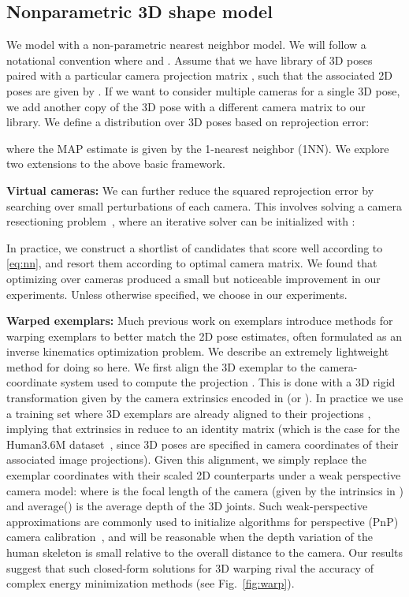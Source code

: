 \documentclass[10pt,twocolumn,letterpaper]{article}
\begin{document}
\subsection{Nonparametric 3D shape model} \label{nn}
We model  with a non-parametric nearest neighbor model. We will follow a notational convention where  and . Assume that we have library of 3D poses  paired with a particular camera projection matrix , such that the associated 2D poses are given by . If we want to consider multiple cameras for a single 3D pose, we add another copy of the 3D pose with a different camera matrix to our library. We define a distribution over 3D poses based on reprojection error:

\noindent where the MAP estimate is given by the 1-nearest neighbor (1NN).  We explore two extensions to the above basic framework.

{\bf Virtual cameras:} We can further reduce the squared reprojection error by searching over small perturbations of each camera. This involves solving a camera resectioning problem~\cite{hartley2003multiple}, where an iterative solver can be initialized with :

In practice, we construct a shortlist of  candidates that score well according to \eqref{eq:nn}, and resort them according to optimal camera matrix. We found that optimizing over cameras produced a small but noticeable improvement in our experiments. Unless otherwise specified, we choose  in our experiments.

{\bf Warped exemplars:} Much previous work on exemplars introduce methods for warping exemplars to better match the 2D pose estimates, often formulated as an inverse kinematics optimization problem. We describe an extremely lightweight method for doing so here. We first align the 3D exemplar to the camera-coordinate system used to compute the projection . This is done with a 3D rigid transformation given by the camera extrinsics encoded in  (or ). In practice we use a training set  where 3D exemplars are already aligned to their projections , implying that extrinsics in  reduce to an identity matrix (which is the case for the Human3.6M dataset~\cite{h36m_pami}, since 3D poses are specified in camera coordinates of their associated image projections). Given this alignment, we simply replace the  exemplar coordinates with their scaled 2D counterparts  under a weak perspective camera model: 
\noindent where  is the focal length of the camera (given by the intrinsics in ) and average() is the average depth of the 3D joints. Such weak-perspective approximations are commonly used to initialize algorithms for perspective (PnP) camera calibration~\cite{lu2000fast}, and will be reasonable when the depth variation of the human skeleton is small relative to the overall distance to the camera.  Our results suggest that such closed-form solutions for 3D warping rival the accuracy of complex energy minimization methods (see Fig.~\ref{fig:warp}).
\end{document}
